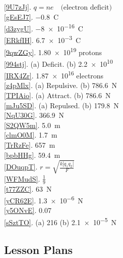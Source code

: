 \documentclass[dvipsnames]{article}
\numberwithin{equation}{section}
\numberwithin{figure}{section}
\begin{document}
\ref{9U7zJj}. $q = n e \quad \text{(electron deficit)}$\\
\ref{gEsEJ7}. \qty{-0.8}{C}\\
\ref{d3zygU}. \SI{-8e-16}{C}\\
\ref{ERkfIH}. \SI{6.7e-3}{C}\\
\ref{9qwZGy}. \SI{1.80e19}{} protons\\
\ref{994stj}. (a) Deficit. \hspace{1em} (b) \SI{2.2e10}{}\\
\ref{IRX4Zr}. \SI{1.87e16}{} electrons\\
\ref{z4pMlx}. (a) Repulsive. \hspace{1em} (b) \SI{786.6}{N}\\
\ref{TPIAio}. (a) Attract. \hspace{1em} (b) \SI{786.6}{N}\\
\ref{mJu5SD}. (a) Repulsed. (b) \SI{179.8}{N}\\
\ref{NqU30G}. \SI{366.9}{N}\\
\ref{S2QW5m}. \SI{5.0}{m}\\
\ref{clmO0M}. \qty{1.7}{m}\\
\ref{TrRzFe}. \qty{657}{m}\\
\ref{bpbHHg}. \qty{59.4}{m}\\
\ref{DOuqpT}. $r = \sqrt{\frac{k |q_1 q_2|}{F}}$\\
\ref{WFMudS}. $\frac{1}{9}$\\
\ref{t77ZZC}. \SI{63}{N}\\
\ref{yCR62E}. \SI{1.3e-6}{N}\\
\ref{y5ONvE}. 0.07\\
\ref{sSztTO}. (a) 216 \hspace{1em} (b) \SI{2.1e-5}{N}\\


\clearpage
\printnoidxglossaries

\clearpage
\subsection*{Lesson Plans}
\end{document}
